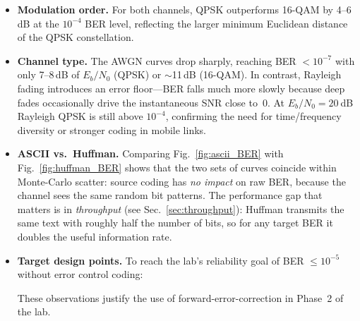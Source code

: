\begin{itemize}
\item \textbf{Modulation order.}  
      For both channels, QPSK outperforms 16-QAM by 4–6\,dB at the
      \(10^{-4}\) BER level, reflecting the larger minimum Euclidean distance
      of the QPSK constellation.

\item \textbf{Channel type.}  
      The AWGN curves drop sharply, reaching BER \(<10^{-7}\) with only
      7–8\,dB of \(E_b/N_0\) (QPSK) or $\sim$11\,dB (16-QAM).
      In contrast, Rayleigh fading introduces an error floor—BER falls much
      more slowly because deep fades occasionally drive the instantaneous
      SNR close to~0.  At \(E_b/N_0=20\) dB Rayleigh QPSK is still above
      \(10^{-4}\), confirming the need for time/frequency diversity or
      stronger coding in mobile links.

\item \textbf{ASCII vs.\ Huffman.}  
      Comparing Fig.~\ref{fig:ascii_BER} with
      Fig.~\ref{fig:huffman_BER} shows that the two sets of curves coincide
      within Monte-Carlo scatter: source coding has \emph{no impact} on raw
      BER, because the channel sees the same random bit patterns.
      The performance gap that matters is in \emph{throughput}
      (see Sec.~\ref{sec:throughput}): Huffman transmits the same text with
      roughly half the number of bits, so for any target BER it doubles the
      useful information rate.

\item \textbf{Target design points.}  
      To reach the lab’s reliability goal of BER $\le 10^{-5}$ without error
      control coding:
      These observations justify the use of forward-error-correction in
      Phase~2 of the lab.
\end{itemize}

